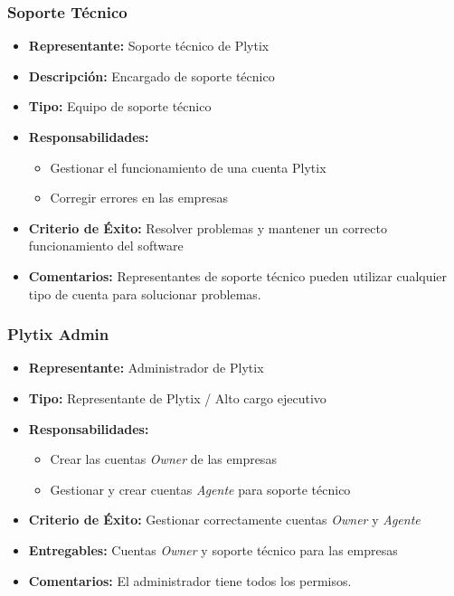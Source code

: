 \documentclass{article}
\begin{document}
\subsubsection{Soporte Técnico}

\begin{itemize}
    \item \textbf{Representante:} Soporte técnico de Plytix
    \item \textbf{Descripción:} Encargado de soporte técnico
    \item \textbf{Tipo:} Equipo de soporte técnico
    \item \textbf{Responsabilidades:}
    \begin{itemize}
        \item Gestionar el funcionamiento de una cuenta Plytix
        \item Corregir errores en las empresas
    \end{itemize}
    \item \textbf{Criterio de Éxito:} Resolver problemas y mantener un correcto funcionamiento del software
    \item \textbf{Comentarios:} Representantes de soporte técnico pueden utilizar cualquier tipo de cuenta para solucionar problemas.
\end{itemize}

\subsubsection{Plytix Admin}

\begin{itemize}
    \item \textbf{Representante:} Administrador de Plytix
    \item \textbf{Tipo:} Representante de Plytix / Alto cargo ejecutivo
    \item \textbf{Responsabilidades:}
    \begin{itemize}
        \item Crear las cuentas \textit{Owner} de las empresas
        \item Gestionar y crear cuentas \textit{Agente} para soporte técnico
    \end{itemize}
    \item \textbf{Criterio de Éxito:} Gestionar correctamente cuentas \textit{Owner} y \textit{Agente}
    \item \textbf{Entregables:} Cuentas \textit{Owner} y soporte técnico para las empresas
    \item \textbf{Comentarios:} El administrador tiene todos los permisos.
\end{itemize}
\end{document}
